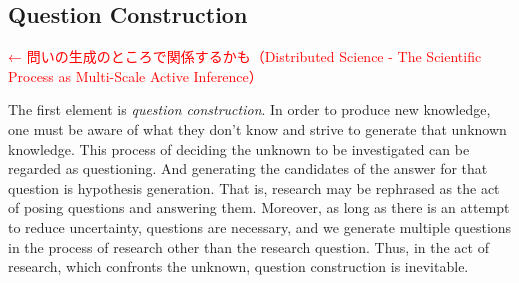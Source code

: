 


\subsection{Question Construction}
\label{section-question-construction}

\textcolor{red}{← 問いの生成のところで関係するかも（Distributed Science - The Scientific Process as Multi-Scale Active Inference）}

The first element is \textit{question construction}. In order to produce new knowledge, one must be aware of what they don't know and strive to generate that unknown knowledge. This process of deciding the unknown to be investigated can be regarded as questioning. And generating the candidates of the answer for that question is hypothesis generation. That is, research may be rephrased as the act of posing questions and answering them. Moreover, as long as there is an attempt to reduce uncertainty, questions are necessary, and we generate multiple questions in the process of research other than the research question. Thus, in the act of research, which confronts the unknown, question construction is inevitable.

